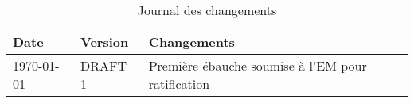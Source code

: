 
%

\begin{table}[h]

    \centering

    \begin{tabularx}{\textwidth}{ @{} p{4cm} p{3cm} X @{} }

        \textbf{Date} & \textbf{Version} & \textbf{Changements}\\ \toprule

    	\today{} & DRAFT 1 & Première ébauche soumise à l'EM pour ratification\\ 
    	
    	\bottomrule
    	

    \end{tabularx}

    \caption[Changements]{Journal des changements}

    \label{record-of-changes}

\end{table} 